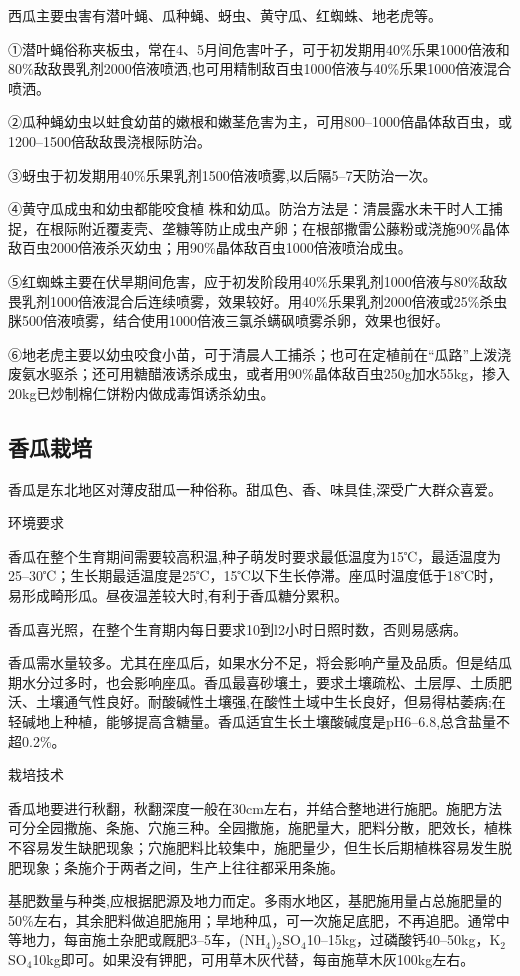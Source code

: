 \documentclass{ctexbook}
\begin{document}
西瓜主要虫害有潜叶蝇、瓜种蝇、蚜虫、黄守瓜、红蜘蛛、地老虎等。

①潜叶蝇俗称夹板虫，常在4、5月间危害叶子，可于初发期用40\%乐果1000倍液和80\%敌敌畏乳剂2000倍液喷洒,也可用精制敌百虫1000倍液与40\%乐果1000倍液混合喷洒。

②瓜种蝇幼虫以蛀食幼苗的嫩根和嫩茎危害为主，可用800--1000倍晶体敌百虫，或1200--1500倍敌敌畏浇根际防治。

③蚜虫于初发期用40\%乐果乳剂1500倍液喷雾,以后隔5--7天防治一次。

④黄守瓜成虫和幼虫都能咬食植
株和幼瓜。防治方法是：清晨露水未干时人工捕捉，在根际附近覆麦壳、垄糠等防止成虫产卵；在根部撒雷公藤粉或浇施90\%晶体敌百虫2000倍液杀灭幼虫；用90\%晶体敌百虫1000倍液喷治成虫。

⑤红蜘蛛主要在伏旱期间危害，应于初发阶段用40\%乐果乳剂1000倍液与80\%敌敌畏乳剂1000倍液混合后连续喷雾，效果较好。用40\%乐果乳剂2000倍液或25\%杀虫脒500倍液喷雾，结合使用1000倍液三氯杀螨砜喷雾杀卵，效果也很好。

⑥地老虎主要以幼虫咬食小苗，可于清晨人工捕杀；也可在定植前在“瓜路”上泼浇废氨水驱杀；还可用糖醋液诱杀成虫，或者用90\%晶体敌百虫250g加水55kg，掺入20kg已炒制棉仁饼粉内做成毒饵诱杀幼虫。
\subsection{香瓜栽培}
香瓜是东北地区对薄皮甜瓜一种俗称。甜瓜色、香、味具佳,深受广大群众喜爱。

环境要求

香瓜在整个生育期间需要较高积温,种子萌发时要求最低温度为15℃，最适温度为25--30℃；生长期最适温度是25℃，15℃以下生长停滞。座瓜时温度低于18℃时，易形成畸形瓜。昼夜温差较大时,有利于香瓜糖分累积。

香瓜喜光照，在整个生育期内每日要求10到l2小时日照时数，否则易感病。

香瓜需水量较多。尤其在座瓜后，如果水分不足，将会影响产量及品质。但是结瓜期水分过多时，也会影响座瓜。香瓜最喜砂壤土，要求土壤疏松、土层厚、土质肥沃、土壤通气性良好。耐酸碱性土壤强,在酸性土域中生长良好，但易得枯萎病;在轻碱地上种植，能够提高含糖量。香瓜适宜生长土壤酸碱度是pH6--6.8,总含盐量不超0.2\%。

栽培技术

香瓜地要进行秋翻，秋翻深度一般在30cm左右，并结合整地进行施肥。施肥方法可分全园撒施、条施、穴施三种。全园撒施，施肥量大，肥料分散，肥效长，植株不容易发生缺肥现象；穴施肥料比较集中，施肥量少，但生长后期植株容易发生脱肥现象；条施介于两者之间，生产上往往都采用条施。

基肥数量与种类,应根据肥源及地力而定。多雨水地区，基肥施用量占总施肥量的50\%左右，其余肥料做追肥施用；旱地种瓜，可一次施足底肥，不再追肥。通常中等地力，每亩施土杂肥或厩肥3--5车，(NH$_4$)$_2$SO$_4$10--15kg，过磷酸钙40--50kg，K$_2$SO$_4$10kg即可。如果没有钾肥，可用草木灰代替，每亩施草木灰100kg左右。
\end{document}
